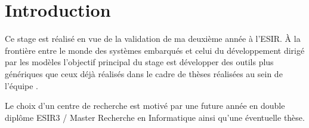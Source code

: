 \section*{Introduction} %

Ce stage est réalisé en vue de la validation de ma deuxième année à l'ESIR. À la frontière entre le monde des systèmes embarqués et celui du développement dirigé par les modèles l'objectif principal du stage est développer des outils plus génériques que ceux déjà réalisés dans le cadre de thèses réalisées au sein de l'équipe \diver.

Le choix d'un centre de recherche est motivé par une future année en double diplôme ESIR3 / Master Recherche en Informatique ainsi qu'une éventuelle thèse.